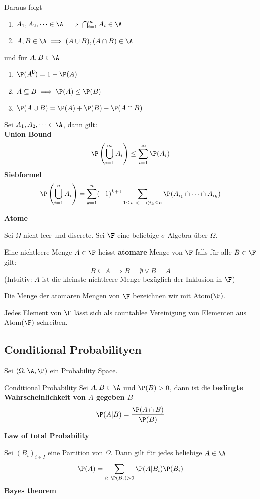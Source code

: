 Daraus folgt
\begin{enumerate}[label=\arabic*.]
    \item $A_1,A_2, \dots \in \A \implies \bigcap_{i=1}^{\infty}A_i \in \A$
    \item $A,B \in \A \implies (A \cup B), (A \cap B) \in \A$
\end{enumerate}
und für $A, B \in \A$
\begin{enumerate}[label=\arabic*.]
    \item $\P(A^\complement) = 1 - \P(A)$
    \item $A \subseteq B \implies \P(A) \leq \P(B)$
    \item $\P(A \cup B) = \P(A)+\P(B)-\P(A \cap B)$
\end{enumerate}
Sei $A_1,A_2, \dots \in \A$, dann gilt:\\
\textbf{Union Bound}
    $$\P\left(\bigcup_{i=1}^{\infty} A_i \right) \leq \sum_{i=1}^{\infty}\P(A_i)$$
\textbf{Siebformel}
    $$\P\left(\bigcup_{i=1}^{n}A_i\right) = \sum_{k = 1}^{n}(-1)^{k+1}\sum_{1\leq i_1 < \dots < i_k \leq n} \P(A_{i_1} \cap \dots \cap A_{i_k})$$

    \textbf{Atome}

        Sei $\Omega$ nicht leer und discrete. Sei $\F$ eine beliebige $\sigma$-Algebra über $\Omega$. 
    
        Eine nichtleere Menge $A \in \F$ heisst \textbf{atomare} Menge von $\F$ falls für alle $B \in \F$ gilt:
        $$B \subseteq A \implies B = \emptyset \lor B = A$$
        (Intuitiv: $A$ ist die kleinste nichtleere Menge bezüglich der Inklusion in $\F$)
    
        Die Menge der atomaren Mengen von $\F$ bezeichnen wir mit Atom$(\F)$.
    
        Jedes Element von $\F$ lässt sich als countablee Vereinigung von Elementen aus Atom$(\F)$ schreiben.
    
\subsection{Conditional Probabilityen}
 Sei $(\Omega, \A, \P)$ ein Probability Space.
 \begin{mainbox}{Conditional Probability}
    Sei $A, B \in \A$ und $\P(B) > 0$, dann ist die \textbf{bedingte Wahrscheinlichkeit von $A$ gegeben $B$}
    $$\P(A|B) = \frac{\P(A \cap B)}{\P(B)}$$
 \end{mainbox}
\textbf{Law of total Probability}

Sei $(B_i)_{i\in I}$ eine Partition von $\Omega$. Dann gilt für jedes beliebige $A \in \A$
$$\P(A) = \sum_{i:\ \P(B_i)>0} \P(A|B_i)\P(B_i)$$
\textbf{Bayes theorem}

